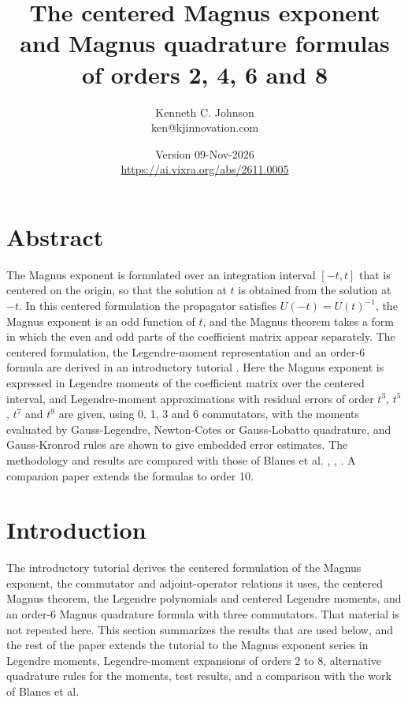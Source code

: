 \documentclass[12pt]{article}
\title{The centered Magnus exponent and Magnus quadrature formulas of orders 2, 4, 6 and 8}
\author{Kenneth C. Johnson\\ \normalsize ken@kjinnovation.com}
\date{Version 09-Nov-2026\\ \url{https://ai.vixra.org/abs/2611.0005}}
\begin{document}
\maketitle

\section*{Abstract}

\noindent The Magnus exponent is formulated over an integration interval $[-t,t]$ that is centered on the origin, so that the solution at $t$ is obtained from the solution at $-t$. In this centered formulation the propagator satisfies $U(-t)=U(t)^{-1}$, the Magnus exponent is an odd function of $t$, and the Magnus theorem takes a form in which the even and odd parts of the coefficient matrix appear separately. The centered formulation, the Legendre-moment representation and an order-6 formula are derived in an introductory tutorial \cite{jtut}. Here the Magnus exponent is expressed in Legendre moments of the coefficient matrix over the centered interval, and Legendre-moment approximations with residual errors of order $t^3$, $t^5$, $t^7$ and $t^9$ are given, using 0, 1, 3 and 6 commutators, with the moments evaluated by Gauss-Legendre, Newton-Cotes or Gauss-Lobatto quadrature, and Gauss-Kronrod rules are shown to give embedded error estimates. The methodology and results are compared with those of Blanes et al. \cite{bcr2000}, \cite{bcr2002}, \cite{bcor2009}. A companion paper \cite{j10} extends the formulas to order 10.

\section*{Introduction}

The introductory tutorial \cite{jtut} derives the centered formulation of the Magnus exponent, the commutator and adjoint-operator relations it uses, the centered Magnus theorem, the Legendre polynomials and centered Legendre moments, and an order-6 Magnus quadrature formula with three commutators. That material is not repeated here. This section summarizes the results that are used below, and the rest of the paper extends the tutorial to the Magnus exponent series in Legendre moments, Legendre-moment expansions of orders 2 to 8, alternative quadrature rules for the moments, test results, and a comparison with the work of Blanes et al.
\end{document}
